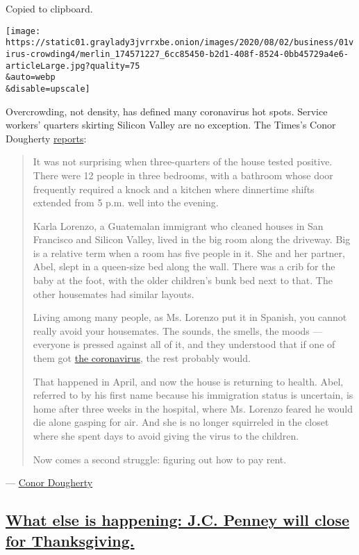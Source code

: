 Copied to clipboard.

\texttt{[image: https://static01.graylady3jvrrxbe.onion/images/2020/08/02/business/01virus-crowding4/merlin\_174571227\_6cc85450-b2d1-408f-8524-0bb45729a4e6-articleLarge.jpg?quality=75\\\&auto=webp\\\&disable=upscale]}

Overcrowding, not density, has defined many coronavirus hot spots.
Service workers' quarters skirting Silicon Valley are no exception. The
Times's Conor Dougherty
\href{https://www.nytimes3xbfgragh.onion/2020/08/01/business/economy/housing-overcrowding-coronavirus.html}{reports}:

\begin{quote}
It was not surprising when three-quarters of the house tested positive.
There were 12 people in three bedrooms, with a bathroom whose door
frequently required a knock and a kitchen where dinnertime shifts
extended from 5 p.m. well into the evening.

Karla Lorenzo, a Guatemalan immigrant who cleaned houses in San
Francisco and Silicon Valley, lived in the big room along the driveway.
Big is a relative term when a room has five people in it. She and her
partner, Abel, slept in a queen-size bed along the wall. There was a
crib for the baby at the foot, with the older children's bunk bed next
to that. The other housemates had similar layouts.

Living among many people, as Ms. Lorenzo put it in Spanish, you cannot
really avoid your housemates. The sounds, the smells, the moods ---
everyone is pressed against all of it, and they understood that if one
of them got
\href{https://www.nytimes3xbfgragh.onion/news-event/coronavirus}{the
coronavirus}, the rest probably would.

That happened in April, and now the house is returning to health. Abel,
referred to by his first name because his immigration status is
uncertain, is home after three weeks in the hospital, where Ms. Lorenzo
feared he would die alone gasping for air. And she is no longer
squirreled in the closet where she spent days to avoid giving the virus
to the children.

Now comes a second struggle: figuring out how to pay rent.
\end{quote}

--- \href{https://www.nytimes3xbfgragh.onion/by/conor-dougherty}{Conor
Dougherty}

\hypertarget{what-else-is-happening-jc-penney-will-close-for-thanksgiving}{%
\subsection{\texorpdfstring{\protect\hyperlink{what-else-is-happening-jc-penney-will-close-for-thanksgiving}{What
else is happening: J.C. Penney will close for
Thanksgiving.}}{What else is happening: J.C. Penney will close for Thanksgiving.}}\label{what-else-is-happening-jc-penney-will-close-for-thanksgiving}}

